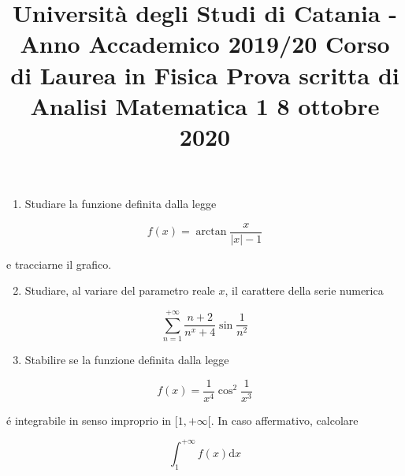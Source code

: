 \documentclass[10pt]{article}
\title{Università degli Studi di Catania - Anno Accademico 2019/20 
 Corso di Laurea in Fisica 
 Prova scritta di Analisi Matematica 1 
 8 ottobre 2020 }
\author{}
\date{}
\begin{document}
\maketitle
\begin{enumerate}
  \item Studiare la funzione definita dalla legge
\end{enumerate}

\[
f(x)=\arctan \frac{x}{|x|-1}
\]

e tracciarne il grafico.

\begin{enumerate}
  \setcounter{enumi}{1}
  \item Studiare, al variare del parametro reale \(x\), il carattere della serie numerica
\end{enumerate}

\[
\sum_{n=1}^{+\infty} \frac{n+2}{n^{x}+4} \sin \frac{1}{n^{2}}
\]

\begin{enumerate}
  \setcounter{enumi}{2}
  \item Stabilire se la funzione definita dalla legge
\end{enumerate}

\[
f(x)=\frac{1}{x^{4}} \cos ^{2} \frac{1}{x^{3}}
\]

é integrabile in senso improprio in \([1,+\infty[\). In caso affermativo, calcolare

\[
\int_{1}^{+\infty} f(x) \mathrm{d} x
\]
\end{document}
